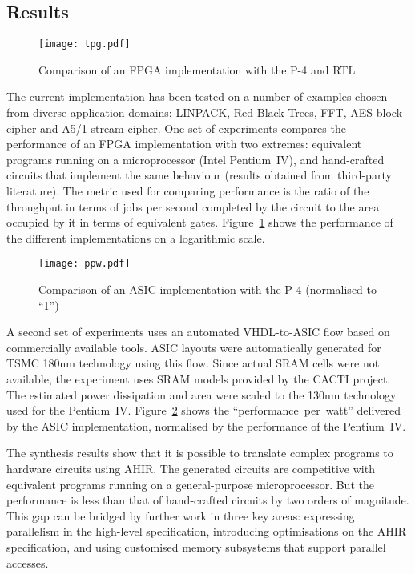 \documentclass[12pt]{article}
\begin{document}
\subsection{Results}

\begin{figure}[h]
\centering
\texttt{[image: tpg.pdf]}
\caption{Comparison of an FPGA implementation with the P-4 and RTL}
\label{figure:tput-area}
\end{figure}

The current implementation has been tested on a number of examples
chosen from diverse application domains: LINPACK, Red-Black Trees,
FFT, AES block cipher and A5/1 stream cipher. One set of experiments
compares the performance of an FPGA implementation with two extremes:
equivalent programs running on a microprocessor (Intel Pentium~IV),
and hand-crafted circuits that implement the same behaviour (results
obtained from third-party literature). The metric used for comparing
performance is the ratio of the throughput in terms of jobs per second
completed by the circuit to the area occupied by it in terms of
equivalent gates. Figure~\ref{figure:tput-area} shows the performance
of the different implementations on a logarithmic scale.

\begin{figure}[h]
\centering
\texttt{[image: ppw.pdf]}
\caption{Comparison of an ASIC implementation with the P-4
(normalised to ``1'')}
\label{figure:ppw}
\end{figure}

A second set of experiments uses an automated VHDL-to-ASIC flow based
on commercially available tools. ASIC layouts were automatically
generated for TSMC 180nm technology using this flow. Since actual SRAM
cells were not available, the experiment uses SRAM models provided by
the CACTI project. The estimated power dissipation and area were
scaled to the 130nm technology used for the Pentium~IV. 
Figure~\ref{figure:ppw} shows the ``performance~per~watt'' delivered
by the ASIC implementation, normalised by the performance of the
Pentium~IV.

The synthesis results show that it is possible to translate complex
programs to hardware circuits using AHIR. The generated circuits are
competitive with equivalent programs running on a general-purpose
microprocessor. But the performance is less than that of hand-crafted
circuits by two orders of magnitude. This gap can be bridged by
further work in three key areas: expressing parallelism in the
high-level specification, introducing optimisations on the AHIR
specification, and using customised memory subsystems that support
parallel accesses.
\end{document}
